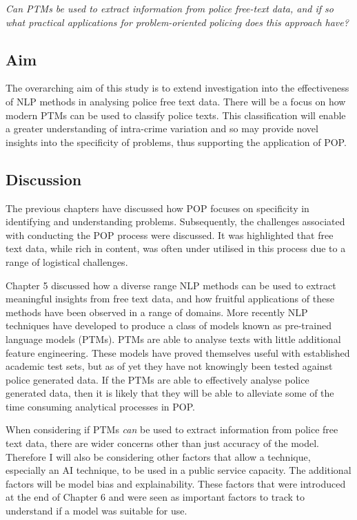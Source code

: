 \emph{Can PTMs be used to extract information from police free-text data, and if so what practical applications for problem-oriented policing does this approach have?}

\subsection{Aim} 

The overarching aim of this study is to extend investigation into the effectiveness of NLP methods in analysing police free text data. There will be a focus on how modern PTMs can be used to classify police texts. This classification will enable a greater understanding of intra-crime variation and so may provide novel insights into the specificity of problems, thus supporting the application of POP. 



\subsection{Discussion} 

The previous chapters have discussed how POP focuses on specificity in identifying  and understanding problems. Subsequently, the challenges associated with conducting the POP process were discussed. It was highlighted that free text data, while rich in content, was often under utilised in this process due to a range of logistical challenges. 

Chapter 5 discussed how a diverse range NLP methods can be used to extract meaningful insights from free text data, and how fruitful applications of these methods have been observed in a range of domains. More recently NLP techniques have developed to produce a class of models known as pre-trained language models (PTMs). PTMs are able to analyse texts with little additional feature engineering. These models have proved themselves useful with established academic test sets, but as of yet they have not knowingly been tested against police generated data. If the PTMs are able to effectively analyse police generated data, then it is likely that they will be able to alleviate some of the time consuming analytical processes in POP. 

When considering if PTMs \emph{can} be used to extract information from police free text data, there are wider concerns other than just accuracy of the model. Therefore I will also be considering other factors that allow a technique, especially an AI technique, to be used in a public service capacity. The additional factors will be model bias and explainability. These factors that were introduced at the end of Chapter 6 and were seen as important factors to track to understand if a model was suitable for use.

